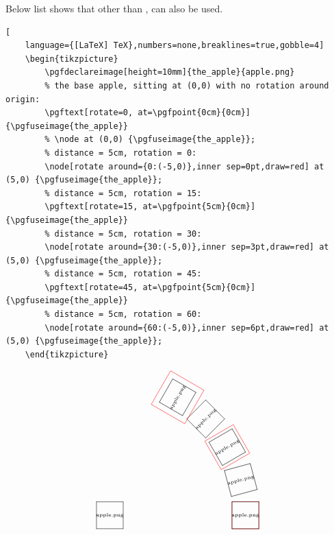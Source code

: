 \documentclass[lualatex]{jlreq}
\begin{document}
Below list shows that other than \lstinlineiv{\node}, \lstinlineiv{\pgftext} can also be used.
\begin{lstlisting}[
    language={[LaTeX] TeX},numbers=none,breaklines=true,gobble=4]
    \begin{tikzpicture}
        \pgfdeclareimage[height=10mm]{the_apple}{apple.png}
        % the base apple, sitting at (0,0) with no rotation around origin:
        \pgftext[rotate=0, at=\pgfpoint{0cm}{0cm}]{\pgfuseimage{the_apple}}
        % \node at (0,0) {\pgfuseimage{the_apple}};
        % distance = 5cm, rotation = 0:
        \node[rotate around={0:(-5,0)},inner sep=0pt,draw=red] at (5,0) {\pgfuseimage{the_apple}};
        % distance = 5cm, rotation = 15:
        \pgftext[rotate=15, at=\pgfpoint{5cm}{0cm}]{\pgfuseimage{the_apple}}
        % distance = 5cm, rotation = 30:
        \node[rotate around={30:(-5,0)},inner sep=3pt,draw=red] at (5,0) {\pgfuseimage{the_apple}};
        % distance = 5cm, rotation = 45:
        \pgftext[rotate=45, at=\pgfpoint{5cm}{0cm}]{\pgfuseimage{the_apple}}
        % distance = 5cm, rotation = 60:
        \node[rotate around={60:(-5,0)},inner sep=6pt,draw=red] at (5,0) {\pgfuseimage{the_apple}};
    \end{tikzpicture}
\end{lstlisting}
\[
    \begin{tikzpicture}
        \pgfdeclareimage[height=10mm]{the_apple}{apple.png}
        \pgftext[rotate=0, at=\pgfpoint{0cm}{0cm}]{\pgfuseimage{the_apple}}
        \node[rotate around={0:(-5,0)},inner sep=0pt,draw=red] at (5,0) {\pgfuseimage{the_apple}};
        \pgftext[rotate=15, at=\pgfpoint{5cm}{0cm}]{\pgfuseimage{the_apple}}
        \node[rotate around={30:(-5,0)},inner sep=3pt,draw=red] at (5,0) {\pgfuseimage{the_apple}};
        \pgftext[rotate=45, at=\pgfpoint{5cm}{0cm}]{\pgfuseimage{the_apple}}
        \node[rotate around={60:(-5,0)},inner sep=6pt,draw=red] at (5,0) {\pgfuseimage{the_apple}};
    \end{tikzpicture}
\]
\end{document}
